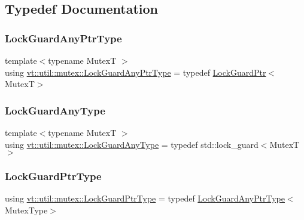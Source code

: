 \subsection{Typedef Documentation}
\mbox{\label{namespacevt_1_1util_1_1mutex_ab8d2986992b726eed741bcae3bf9a789}} 
\subsubsection{\texorpdfstring{Lock\+Guard\+Any\+Ptr\+Type}{LockGuardAnyPtrType}}
{\footnotesize\ttfamily template$<$typename MutexT $>$ \\
using \hyperlink{namespacevt_1_1util_1_1mutex_ab8d2986992b726eed741bcae3bf9a789}{vt\+::util\+::mutex\+::\+Lock\+Guard\+Any\+Ptr\+Type} = typedef \hyperlink{structvt_1_1util_1_1mutex_1_1_lock_guard_ptr}{Lock\+Guard\+Ptr}$<$MutexT$>$}

\mbox{\label{namespacevt_1_1util_1_1mutex_ae88ee37c8846b0738a5137f96f912394}} 
\subsubsection{\texorpdfstring{Lock\+Guard\+Any\+Type}{LockGuardAnyType}}
{\footnotesize\ttfamily template$<$typename MutexT $>$ \\
using \hyperlink{namespacevt_1_1util_1_1mutex_ae88ee37c8846b0738a5137f96f912394}{vt\+::util\+::mutex\+::\+Lock\+Guard\+Any\+Type} = typedef std\+::lock\+\_\+guard$<$MutexT$>$}

\mbox{\label{namespacevt_1_1util_1_1mutex_aca2c02dfb2d46edf4fc867f9ce64d0e5}} 
\subsubsection{\texorpdfstring{Lock\+Guard\+Ptr\+Type}{LockGuardPtrType}}
{\footnotesize\ttfamily using \hyperlink{namespacevt_1_1util_1_1mutex_aca2c02dfb2d46edf4fc867f9ce64d0e5}{vt\+::util\+::mutex\+::\+Lock\+Guard\+Ptr\+Type} = typedef \hyperlink{namespacevt_1_1util_1_1mutex_ab8d2986992b726eed741bcae3bf9a789}{Lock\+Guard\+Any\+Ptr\+Type}$<$Mutex\+Type$>$}

